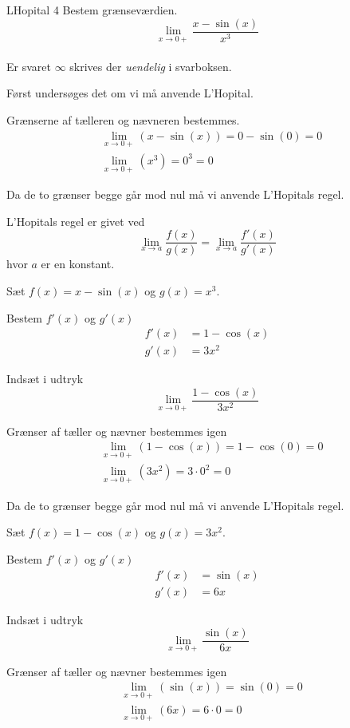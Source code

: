 \documentclass{article}
\begin{document}
\begin{exercise}{LHopital 4}
	Bestem grænseværdien.
	\[
	\lim_{x \to 0+} \frac{x - \sin(x)}{x^3}
	\] 
	\\
	Er svaret $\infty$ skrives der \emph{uendelig} i svarboksen.
	
	
	\hint
	Først undersøges det om vi må anvende L'Hopital.
	
	\hint
	Grænserne af tælleren og nævneren bestemmes.
	\begin{align*}
		&\lim_{x \to 0+} (x - \sin(x)) = 0 - \sin(0) =  0 \\
		&\lim_{x \to 0+} (x^3) = 0^3 = 0
	\end{align*}
	
	\hint
	Da de to grænser begge går mod nul må vi  anvende L'Hopitals regel. 
	
	\hint
	L'Hopitals regel er givet ved
	\[
	\lim_{x \to a} \frac{f(x)}{g(x)} = \lim_{x \to a} \frac{f'(x)}{g'(x)} 
	\]
	hvor $a$ er en konstant.
	
	\hint
	Sæt $f(x) = x - \sin(x)$ og $g(x) = x^3$. 
	
	\hint
	Bestem $f'(x)$ og $g'(x)$
	\begin{align*}
		f'(x) &= 1 - \cos(x) \\
		g'(x) &= 3x^2
	\end{align*}
	
	\hint
	Indsæt i udtryk
	\[
	\lim_{x \to 0+} \frac{1 - \cos(x)}{3x^2} 
	\]
	
	\hint
	Grænser af tæller og nævner bestemmes igen
	\begin{align*}
		&\lim_{x \to 0+} (1 - \cos(x)) = 1 - \cos(0) =  0 \\
		&\lim_{x \to 0+} (3x^2) = 3 \cdot 0^2 = 0
	\end{align*}
	
	\hint
	Da de to grænser begge går mod nul må vi  anvende L'Hopitals regel. 
	
	\hint
	Sæt $f(x) = 1 - \cos(x)$ og $g(x) = 3x^2$. 
	
	\hint
	Bestem $f'(x)$ og $g'(x)$
	\begin{align*}
		f'(x) &=  \sin(x) \\
		g'(x) &= 6x
	\end{align*}
	
	\hint
	Indsæt i udtryk
	\[
	\lim_{x \to 0+} \frac{\sin(x)}{6x} 
	\]
	
	\hint
	Grænser af tæller og nævner bestemmes igen
	\begin{align*}
		&\lim_{x \to 0+} (\sin(x)) = \sin(0) =  0 \\
		&\lim_{x \to 0+} (6x) = 6 \cdot 0 = 0
	\end{align*}
	

\end{exercise}
\end{document}
